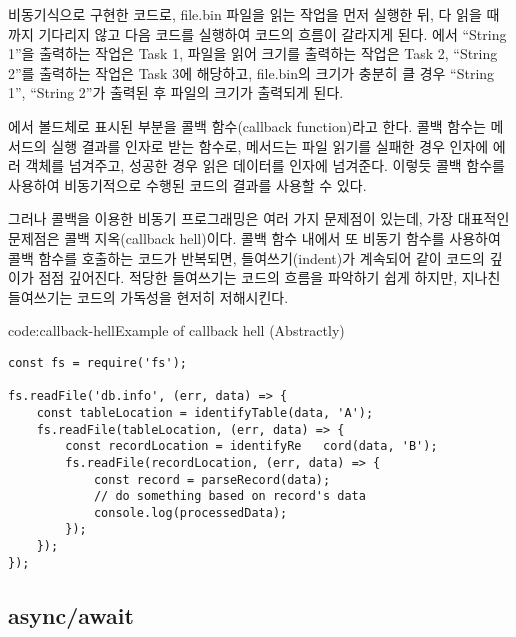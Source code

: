 


\는 \를 비동기식으로 구현한 코드로, file.bin 파일을 읽는 작업을 먼저 실행한 뒤, 다 읽을 때까지 기다리지 않고 다음 코드를 실행하여 코드의 흐름이 갈라지게 된다. 에서 ``String 1''을 출력하는 작업은 Task 1, 파일을 읽어 크기를 출력하는 작업은 Task 2, ``String 2''를 출력하는 작업은 Task 3에 해당하고, file.bin의 크기가 충분히 클 경우 ``String 1'', ``String 2''가 출력된 후 파일의 크기가 출력되게 된다.

에서 볼드체로 표시된 부분을 콜백 함수(callback function)라고 한다. 콜백 함수는 메서드의 실행 결과를 인자로 받는 함수로,  메서드는 파일 읽기를 실패한 경우  인자에 에러 객체를 넘겨주고, 성공한 경우 읽은 데이터를  인자에 넘겨준다. 이렇듯 콜백 함수를 사용하여 비동기적으로 수행된 코드의 결과를 사용할 수 있다.

그러나 콜백을 이용한 비동기 프로그래밍은 여러 가지 문제점이 있는데, 가장 대표적인 문제점은 콜백 지옥(callback hell)이다. 콜백 함수 내에서 또 비동기 함수를 사용하여 콜백 함수를 호출하는 코드가 반복되면, 들여쓰기(indent)가 계속되어 \과 같이 코드의 깊이가 점점 깊어진다. 적당한 들여쓰기는 코드의 흐름을 파악하기 쉽게 하지만, 지나친 들여쓰기는 코드의 가독성을 현저히 저해시킨다.

\begin{code}{code:callback-hell}{Example of callback hell (Abstractly)}
\begin{verbatim}
const fs = require('fs');

fs.readFile('db.info', (err, data) => {
    const tableLocation = identifyTable(data, 'A');
    fs.readFile(tableLocation, (err, data) => {
        const recordLocation = identifyRe   cord(data, 'B');
        fs.readFile(recordLocation, (err, data) => {
            const record = parseRecord(data);
            // do something based on record's data
            console.log(processedData);
        });
    });
});
\end{verbatim}
\end{code}

\subsection*{async/await}

